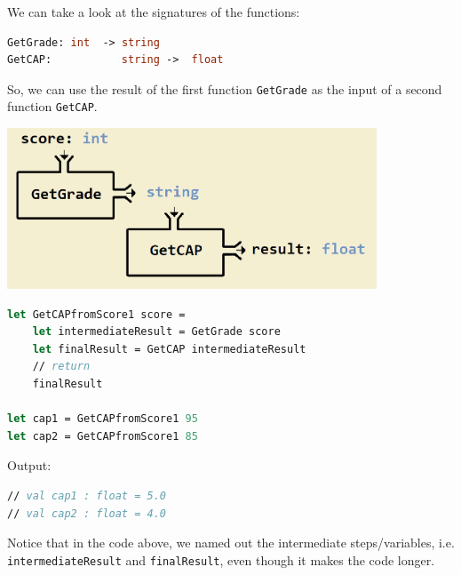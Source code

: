 \documentclass[12pt]{article}
\begin{document}
We can take a look at the signatures of the functions:
\begin{lstlisting}[language=FSharp]
GetGrade: int  -> string
GetCAP:           string ->  float
\end{lstlisting}
So, we can use the result of the first function \texttt{GetGrade} as the input of a second function \texttt{GetCAP}. 
\begin{center}
\includegraphics[width=11cm]{pictures/picture22.png}
\end{center}
\begin{lstlisting}[language=FSharp]
let GetCAPfromScore1 score =
    let intermediateResult = GetGrade score
    let finalResult = GetCAP intermediateResult
    // return
    finalResult

let cap1 = GetCAPfromScore1 95
let cap2 = GetCAPfromScore1 85
\end{lstlisting}

\pagebreak
Output:
\begin{lstlisting}[language=FSharp]
// val cap1 : float = 5.0
// val cap2 : float = 4.0
\end{lstlisting}

Notice that in the code above, we named out the intermediate steps/variables, i.e. \\\texttt{intermediateResult} and \texttt{finalResult}, even though it makes the code longer.
\end{document}
